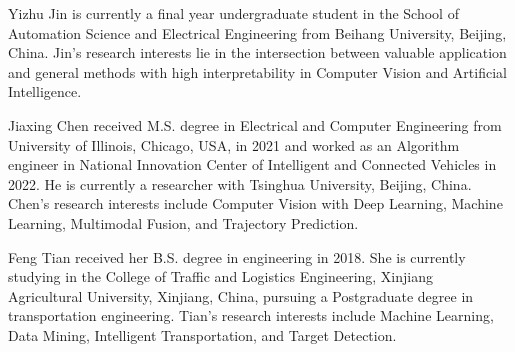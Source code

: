 \documentclass[lettersize,journal]{IEEEtran}
\begin{document}


\begin{IEEEbiography}{Yizhu Jin} is currently a final year undergraduate student in the School of Automation Science and Electrical Engineering from Beihang University, Beijing, China. Jin's research interests lie in the intersection between valuable application and general methods with high interpretability in Computer Vision and Artificial Intelligence.  
\end{IEEEbiography}


\begin{IEEEbiography}{Jiaxing Chen} received M.S. degree in Electrical and Computer Engineering from University of Illinois, Chicago, USA, in 2021 and worked as an Algorithm engineer in National Innovation Center of Intelligent and Connected Vehicles in 2022. He is currently a researcher with Tsinghua University, Beijing, China. Chen's research interests include Computer Vision with Deep Learning, Machine Learning, Multimodal Fusion, and Trajectory Prediction.
\end{IEEEbiography}

\begin{IEEEbiography}{Feng Tian} received her B.S. degree in engineering in 2018. She is currently studying in the College of Traffic and Logistics Engineering, Xinjiang Agricultural University, Xinjiang, China, pursuing a Postgraduate degree in transportation engineering. Tian's research interests include Machine Learning, Data Mining, Intelligent Transportation, and Target Detection.
\end{IEEEbiography}
\end{document}
